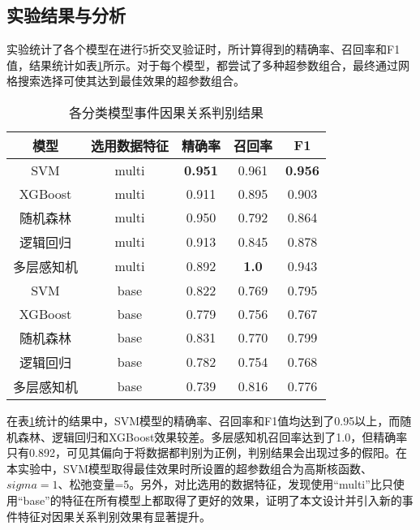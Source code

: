 \subsection{实验结果与分析}

实验统计了各个模型在进行5折交叉验证时，所计算得到的精确率、召回率和F1值，结果统计如表\ref{cause-relation-result}所示。对于每个模型，都尝试了多种超参数组合，最终通过网格搜索选择可使其达到最佳效果的超参数组合。

\begin{table}[htbp]
    \caption{各分类模型事件因果关系判别结果}
    \centering
    \label{cause-relation-result}
    \begin{tabular}{ccccc}
    \toprule[1.5pt]
    模型      & 选用数据特征              & 精确率            & 召回率                           & F1             \\ \midrule[1.5pt]
    SVM     & multi               & \textbf{0.951} & 0.961                         & \textbf{0.956} \\
    XGBoost & multi               & 0.911          & 0.895                         & 0.903          \\
    随机森林    & multi               & 0.950          & 0.792                         & 0.864          \\
    逻辑回归    & multi               & 0.913          & 0.845                         & 0.878          \\
    多层感知机   & multi               & 0.892          & \textbf{1.0}                  & 0.943          \\ \midrule[1pt]
    SVM     & base & 0.822          & 0.769                         & 0.795          \\
    XGBoost & base & 0.779          & 0.756                         & 0.767          \\
    随机森林    & base & 0.831          & 0.770                         & 0.799          \\
    逻辑回归    & base & 0.782          & 0.754                         & 0.768          \\
    多层感知机   & base & 0.739          & 0.816  & 0.776          \\ \bottomrule[1.5pt]
    \end{tabular}
\end{table}

在表\ref{cause-relation-result}统计的结果中，SVM模型的精确率、召回率和F1值均达到了0.95以上，而随机森林、逻辑回归和XGBoost效果较差。多层感知机召回率达到了1.0，但精确率只有0.892，可见其偏向于将数据都判别为正例，判别结果会出现过多的假阳。在本实验中，SVM模型取得最佳效果时所设置的超参数组合为高斯核函数、$sigma=1$、松弛变量=5。另外，对比选用的数据特征，发现使用“multi”比只使用“base”的特征在所有模型上都取得了更好的效果，证明了本文设计并引入新的事件特征对因果关系判别效果有显著提升。

